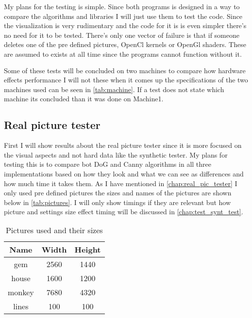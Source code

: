 My plans for the testing is simple. Since both programs is designed in a way to compare the algorithms and libraries I will just use them to test the code. Since the visualization is very rudimentary and the code for it is is even simpler there's no need for it to be tested. There's only one vector of failure is that if someone deletes one of the pre defined pictures, OpenCl kernels or OpenGl shaders. These are assumed to exists at all time since the programs cannot function without it.

Some of these tests will be concluded on two machines to compare how hardware effects performance I will not these when it comes up the specifications of the two machines used can be seen in \autoref{tab:machine}. If a test does not state which machine its concluded than it was done on Machine1.

\begin{table}[H]
\centering
{}
\caption{Specifications of the machines used in testing}
\label{tab:machine}
\end{table}

\subsection{Real picture tester}

First I will show results about the real picture tester since it is more focused on the visual aspects and not hard data like the synthetic tester. My plans for testing this is to compare bot \ac{DoG} and \ac{Canny} algorithms in all three implementations based on how they look and what we can see as differences and how much time it takes them. As I have mentioned in \autoref{chap:real_pic_tester} I only used pre defined pictures the sizes and names of the pictures are shown below in \autoref{tab:pictures}. I will only show timings if they are relevant but how picture and settings size effect timing will be discussed in \autoref{chap:test_synt_test}.

\begin{table}[H]
\centering
\begin{tabular}{| c | c | c |}
\hline
Name & Width & Height \\
\hline \hline	
gem & 2560 & 1440 \\
\hline
house & 1600 & 1200 \\
\hline
monkey & 7680 & 4320 \\
\hline
lines & 100 & 100 \\
\hline
\end{tabular}
\caption{Pictures used and their sizes}
\label{tab:pictures}
\end{table}

